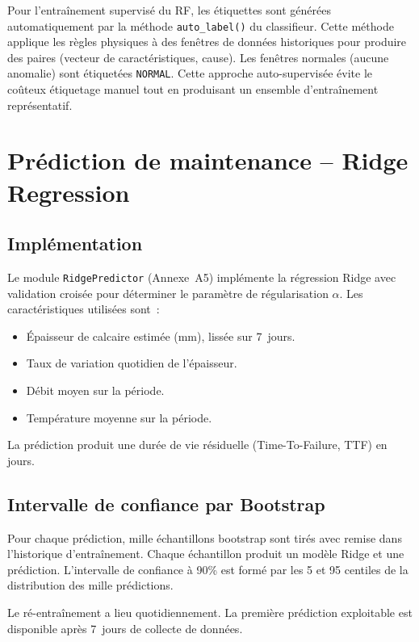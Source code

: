 Pour l'entraînement supervisé du RF, les étiquettes sont générées automatiquement par la méthode \texttt{auto\_label()} du classifieur. Cette méthode applique les règles physiques à des fenêtres de données historiques pour produire des paires (vecteur de caractéristiques, cause). Les fenêtres normales (aucune anomalie) sont étiquetées \texttt{NORMAL}. Cette approche auto-supervisée évite le coûteux étiquetage manuel tout en produisant un ensemble d'entraînement représentatif.

\section{Prédiction de maintenance -- Ridge Regression}

\subsection{Implémentation}

Le module \texttt{RidgePredictor} (Annexe~A5) implémente la régression Ridge avec validation croisée pour déterminer le paramètre de régularisation \(\alpha\). Les caractéristiques utilisées sont~:

\begin{itemize}
  \item Épaisseur de calcaire estimée (mm), lissée sur 7~jours.
  \item Taux de variation quotidien de l'épaisseur.
  \item Débit moyen sur la période.
  \item Température moyenne sur la période.
\end{itemize}

La prédiction produit une durée de vie résiduelle (Time-To-Failure, TTF) en jours.

\subsection{Intervalle de confiance par Bootstrap}

Pour chaque prédiction, mille échantillons bootstrap sont tirés avec remise dans l'historique d'entraînement. Chaque échantillon produit un modèle Ridge et une prédiction. L'intervalle de confiance à 90\% est formé par les 5 et 95 centiles de la distribution des mille prédictions.

Le ré-entraînement a lieu quotidiennement. La première prédiction exploitable est disponible après 7~jours de collecte de données.

